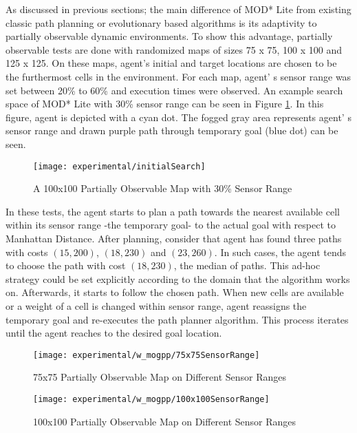 As discussed in previous sections; the main difference of MOD* Lite from existing classic path planning or evolutionary based algorithms is its adaptivity to partially observable dynamic environments. To show this advantage, partially observable tests are done with randomized maps of sizes 75 x 75, 100 x 100 and 125 x 125. On these maps, agent's initial and target locations are chosen to be the furthermost cells in the environment. For each map, agent' s sensor range was set between 20\% to 60\% and execution times were observed. An example search space of MOD* Lite with 30\% sensor range can be seen in Figure \ref{fig:initialSearch}. In this figure, agent is depicted with a cyan dot. The fogged gray area represents agent' s sensor range and drawn purple path through temporary goal (blue dot) can be seen.

\begin{figure}
\centering
\texttt{[image: experimental/initialSearch]}
\caption{A 100x100 Partially Observable Map with 30\% Sensor Range}
\label{fig:initialSearch}
\end{figure}

In these tests, the agent starts to plan a path towards the nearest available cell within its sensor range -the temporary goal- to the actual goal with respect to Manhattan Distance. After planning, consider that agent has found three paths with costs $(15, 200)$, $(18, 230)$ and $(23, 260)$. In such cases, the agent tends to choose the path with cost $(18, 230)$, the median of paths. This ad-hoc strategy could be set explicitly according to the domain that the algorithm works on. Afterwards, it starts to follow the chosen path. When new cells are available or a weight of a cell is changed within sensor range, agent reassigns the temporary goal and re-executes the path planner algorithm. This process iterates until the agent reaches to the desired goal location.

\begin{figure}
\centering
\texttt{[image: experimental/w\_mogpp/75x75SensorRange]}
\caption{75x75 Partially Observable Map on Different Sensor Ranges}
\label{fig:75x75sensor}
\end{figure}

\begin{figure}
\centering
\texttt{[image: experimental/w\_mogpp/100x100SensorRange]}
\caption{100x100 Partially Observable Map on Different Sensor Ranges}
\label{fig:100x100sensor}
\end{figure}


